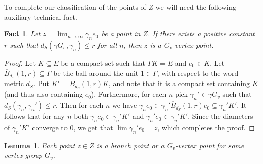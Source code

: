 \documentclass[12pt, a4paper]{article}
\newcommand{\8}{\infty}
\theoremstyle{break}
\newtheorem{lm}[thm]{Lemma}
\newtheorem{fact}[thm]{Fact}
\theoremstyle{defbreak}
\newcommand{\ol}[1]{\overline{#1}}
\begin{document}
To complete our classification of the points of $Z$ we will need the following auxiliary technical fact.\medskip

\begin{fact}\label{fact:close_enough_to_Gv}
    Let $z = \lim_{n\to \8} \gamma_n e_0$ be a point in $Z$. If there exists a positive constant $r$ such that $d_S(\gamma G_v,\gamma_n) \leqslant r$ for all $n$, then $z$ is a $G_v$-vertex point.
\end{fact}

\begin{proof}
    Let $K \subseteq E$ be a compact set such that $\Gamma K = E$ and $e_0\in K$. 
    Let $\ol{B}_{d_S}(1, r)\subseteq\Gamma$ be the ball around the unit $1\in\Gamma$,
    with respect to the word metric $d_S$.
    Put $K' = \ol{B}_{d_S}(1, r)K$, and note that it is a compact set containing $K$
    (and thus also containing $e_0$). 
    Furthermore, for each $n$ pick $\gamma_n'\in \gamma G_v$ such that $d_S(\gamma_n, \gamma_n') \leqslant r$.
    Then for each $n$ we have $\gamma_n e_0\in\gamma_n'\ol{B}_{d_S}(1, r)e_0\subseteq\gamma_n'K'$. It follows that for any $n$ both $\gamma_ne_0\in\gamma_n'K'$ and
    $\gamma_n'e_0\in\gamma_n'K'$.
    Since the diameters of $\gamma_n'K'$ converge to 0, we get that
    $\lim\gamma_n'e_0=z$, which completes the proof.
\end{proof}


\begin{lm}\label{lemma:classification_in_Z}
    Each point $z \in Z$ is a branch point or a $G_v$-vertex point for some vertex group $G_v$.
\end{lm}
\end{document}
